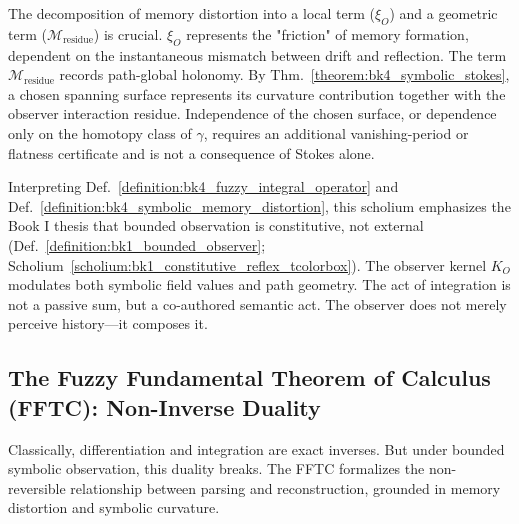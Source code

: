 \begin{remark}
    The decomposition of memory distortion into a local term ($\xi_O$) and a geometric term ($\mathcal{M}_{\text{residue}}$) is crucial. $\xi_O$ represents the "friction" of memory formation, dependent on the instantaneous mismatch between drift and reflection. The term $\mathcal{M}_{\text{residue}}$ records path-global holonomy. By Thm.~\ref{theorem:bk4_symbolic_stokes}, a chosen spanning surface represents its curvature contribution together with the observer interaction residue. Independence of the chosen surface, or dependence only on the homotopy class of $\gamma$, requires an additional vanishing-period or flatness certificate and is not a consequence of Stokes alone.
\end{remark}

\begin{scholium}
\label{scholium:bk4_the_observer_as_weaver}
Interpreting Def.~\ref{definition:bk4_fuzzy_integral_operator} and Def.~\ref{definition:bk4_symbolic_memory_distortion}, this scholium emphasizes the Book I thesis that bounded observation is constitutive, not external (Def.~\ref{definition:bk1_bounded_observer}; Scholium~\ref{scholium:bk1_constitutive_reflex_tcolorbox}).
The observer kernel $K_O$ modulates both symbolic field values and path geometry. The act of integration is not a passive sum, but a co-authored semantic act. The observer does not merely perceive history---it composes it.
\end{scholium}

\subsection{The Fuzzy Fundamental Theorem of Calculus (FFTC): Non-Inverse Duality}
\label{subsec:bk4_fuzzy_calculus_theorem}

Classically, differentiation and integration are exact inverses. But under bounded symbolic observation, this duality breaks. The FFTC formalizes the non-reversible relationship between parsing and reconstruction, grounded in memory distortion and symbolic curvature.

